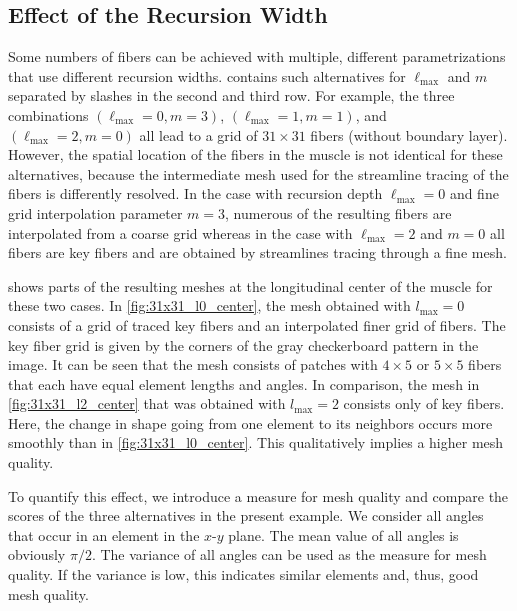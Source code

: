 \subsection{Effect of the Recursion Width}\label{sec:mesh_generation_recursion_width}

Some numbers of fibers can be achieved with multiple, different parametrizations that use different recursion widths.  contains such alternatives for $\ell_\text{max}$ and $m$ separated by slashes in the second and third row. For example, the three combinations $(\ell_\text{max} = 0, m=3)$, $(\ell_\text{max} = 1, m=1)$, and $(\ell_\text{max} = 2, m=0)$ all lead to a grid of $31 \times 31$ fibers (without boundary layer). However, the spatial location of the fibers in the muscle is not identical for these alternatives, because the intermediate mesh used for the streamline tracing of the fibers is differently resolved.
In the case with recursion depth $\ell_\text{max} = 0$ and fine grid interpolation parameter $m=3$, numerous of the resulting fibers are interpolated from a coarse grid whereas in the case with $\ell_\text{max} = 2$ and $m=0$ all fibers are key fibers and are obtained by streamlines tracing through a fine mesh.

 shows parts of the resulting meshes at the longitudinal center of the muscle for these two cases.
In \cref{fig:31x31_l0_center}, the mesh obtained with $l_\text{max}=0$ consists of a grid of traced key fibers and an interpolated finer grid of fibers. The key fiber grid  is given by the corners of the gray checkerboard pattern in the image. It can be seen that the mesh consists of patches with $4 \times 5$ or $5 \times 5$ fibers that each have equal element lengths and angles. In comparison, the mesh in \cref{fig:31x31_l2_center} that was obtained with $l_\text{max}=2$ consists only of key fibers. Here, the change in shape going from one element to its neighbors occurs more smoothly than in \cref{fig:31x31_l0_center}. This qualitatively implies a higher mesh quality.

To quantify this effect, we introduce a measure for mesh quality and compare the scores of the three alternatives in the present example. We consider all angles that occur in an element in the $x$-$y$ plane. The mean value of all angles is obviously $\pi/2$. The variance of all angles can be used as the measure for mesh quality. If the variance is low, this indicates similar elements and, thus, good mesh quality. 

